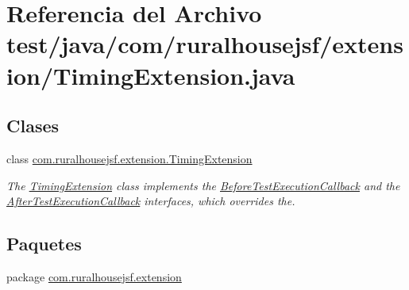 \hypertarget{a00098}{}\section{Referencia del Archivo test/java/com/ruralhousejsf/extension/\+Timing\+Extension.java}
\label{a00098}
\subsection*{Clases}
\begin{DoxyCompactItemize}
\item 
class \mbox{\hyperlink{a00268}{com.\+ruralhousejsf.\+extension.\+Timing\+Extension}}
\begin{DoxyCompactList}\small\item\em The \mbox{\hyperlink{a00268}{Timing\+Extension}} class implements the \mbox{\hyperlink{}{Before\+Test\+Execution\+Callback}} and the \mbox{\hyperlink{}{After\+Test\+Execution\+Callback}} interfaces, which overrides the. \end{DoxyCompactList}\end{DoxyCompactItemize}
\subsection*{Paquetes}
\begin{DoxyCompactItemize}
\item 
package \mbox{\hyperlink{a00124}{com.\+ruralhousejsf.\+extension}}
\end{DoxyCompactItemize}
